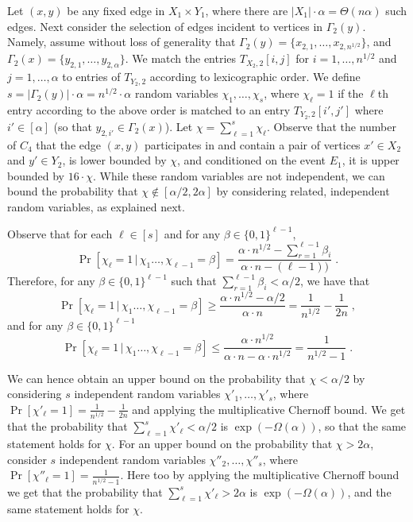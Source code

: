 Let $(x,y)$ be any fixed edge in $X_1\times Y_1$, where there are $|X_1| \cdot \alpha = \Theta(n\alpha)$ such edges.
Next consider the selection of edges incident to vertices in $\Gamma_2(y)$. Namely, assume without loss of generality that $\Gamma_2(y) = \{x_{2,1},\dots,x_{2,n^{1/2}}\}$, and $\Gamma_2(x) = \{y_{2,1},\dots,y_{2,\alpha}\}$. We match the entries $T_{X_2,2}[i,j]$ for $i=1,\dots,n^{1/2}$ and $j=1,\dots,\alpha$ to entries of $T_{Y_2,2}$ according to lexicographic order.
We define $s=|\Gamma_2(y)|\cdot \alpha = n^{1/2}\cdot \alpha$ random variables $\chi_1,\dots,\chi_s$, where $\chi_\ell = 1$ if the $\ell$th entry according to the above order is matched to an entry $T_{Y_2,2}[i',j']$ where $i'\in [\alpha]$ (so that $y_{2,i'}\in \Gamma_2(x)$). Let $\chi = \sum_{\ell=1}^s \chi_\ell$.  Observe that the number of $C_4$ that the edge $(x,y)$ participates in and contain a pair of vertices $x' \in X_2$ and $y' \in Y_2$, is lower bounded by $\chi$, and conditioned on the event $E_1$, it is upper bounded by
$16\cdot \chi$. 
While these random variables are not independent, we can bound the probability that $\chi \notin [\alpha/2,2\alpha]$
by considering related, independent random variables, as explained next.

Observe that for each $\ell \in [s]$
and for any $\beta \in \{0,1\}^{\ell-1}$,
$$\Pr[\chi_\ell=1 \,|\, \chi_1\dots,\chi_{\ell-1}=\beta] =
       \frac{\alpha\cdot n^{1/2} - \sum_{r=1}^{\ell-1}\beta_i}{\alpha\cdot n - (\ell-1))}\;.$$
Therefore, for any $\beta \in \{0,1\}^{\ell-1}$ such that $\sum_{r=1}^{\ell-1}\beta_i < \alpha/2$, we have that
$$\Pr[\chi_\ell=1 \,|\, \chi_1\dots,\chi_{\ell-1}=\beta] \geq
           \frac{\alpha\cdot n^{1/2} - \alpha/2} {\alpha\cdot n } = \frac{1}{n^{1/2}}-\frac{1}{2n}\;,$$
and for any $\beta \in \{0,1\}^{\ell-1}$
$$\Pr[\chi_\ell=1 \,|\, \chi_1\dots,\chi_{\ell-1}=\beta] \leq
    \frac{\alpha\cdot n^{1/2}}{\alpha\cdot n - \alpha\cdot n^{1/2}} = \frac{1}{n^{1/2}-1}\;.$$

We can hence obtain an upper bound on the probability that $\chi < \alpha/2$ by considering $s$ independent random variables $\chi'_1,\dots,\chi'_s$, where $\Pr[\chi'_\ell=1] = \frac{1}{n^{1/2}}-\frac{1}{2n}$ and applying the multiplicative Chernoff bound. We get that the probability that $\sum_{\ell=1}^s \chi'_\ell < \alpha/2$ is $\exp(-\Omega(\alpha))$, so that the same statement holds for $\chi$. For an upper bound on the probability that $\chi > 2 \alpha$, consider $s$ independent random variables $\chi''_2,\dots,\chi''_s$, where $\Pr[\chi''_\ell=1] = \frac{1}{n^{1/2}-1}$. Here too by applying the multiplicative Chernoff bound we get that the probability that $\sum_{\ell=1}^s \chi'_\ell > 2\alpha$ is $\exp(-\Omega(\alpha))$, and the same statement holds for $\chi$.

